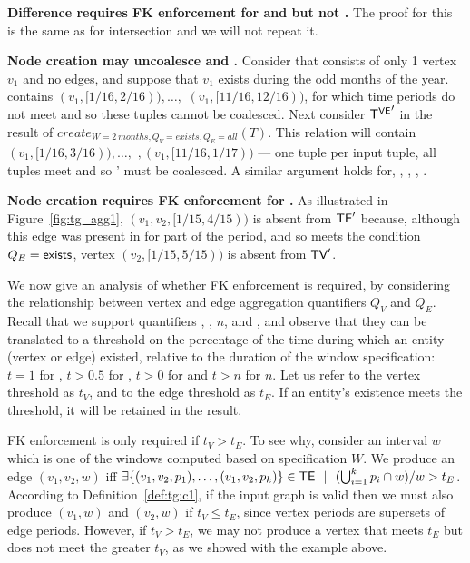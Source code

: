 {\bf Difference requires FK enforcement for \tav and \tae but not \te.}
The proof for this is the same as for intersection and we will not
repeat it.

{\bf Node creation may uncoalesce \tve and \trg.}  Consider
 that consists of only 1 vertex $v_1$ and no edges, and
suppose that $v_1$ exists during the odd months of the year.  \tv
contains $(v_1, [1/16, 2/16)), \ldots,$ $(v_1, [11/16,12/16))$, for
    which time periods do not meet and so these tuples cannot be
    coalesced.  Next consider $\mathsf{T^{VE}}'$ in the result of
    $create_{W=2~months, Q_V=exists,Q_E=all}(T)$.  This relation will
    contain $(v_1, [1/16, 3/16)), \ldots,$ $,(v_1, [11/16,1/17))$ ---
        one tuple per input tuple, all tuples meet and so \tv' must be
        coalesced.  A similar argument holds for, \te, \tav, \tae,
        \trg.

{\bf Node creation requires FK enforcement for \tve.}  As
illustrated in Figure~\ref{fig:tg_agg1}, $(v_1,v_2,[1/15,4/15))$ is
  absent from $\textsf{TE}'$ because, although this edge was present in \tv
  for part of the period, and so meets the condition
  $Q_E=\textsf{exists}$, vertex $(v_2,[1/15,5/15))$ is absent from
    $\textsf{TV}'$.

We now give an analysis of whether FK enforcement is required, by
considering the relationship between vertex and edge aggregation
quantifiers $Q_V$ and $Q_E$.  Recall that we support quantifiers
, ,  $n$, and ,
and observe that they can be translated to a threshold on the
percentage of the time during which an entity (vertex or edge)
existed, relative to the duration of the window specification: $t = 1$
for , $t > 0.5$ for , $t > 0$ for
 and $t > n$ for  $n$.  Let us refer to
the vertex threshold as $t_V$, and to the edge threshold as $t_E$.  If
an entity's existence meets the threshold, it will be retained in the
result.

FK enforcement is only required if $t_V > t_E$.  To see why, consider
an interval $w$ which is one of the windows computed based on
specification $W$.  We produce an edge $(v_1, v_2, w)$ iff $\exists
\{(v_1, v_2, p_1),\ldots,(v_1, v_2, p_k)\} \in
\textsf{TE}~~|~~(\bigcup_{i=1}^k p_i \cap w) / w > t_E$.  According to
Definition~\ref{def:tg:c1}, if the input graph is valid then we must
also produce $(v_1, w)$ and $(v_2, w)$ if $t_V \leq t_E$, since vertex
periods are supersets of edge periods.  However, if $t_V > t_E$, we
may not produce a vertex that meets $t_E$ but does not meet the
greater $t_V$, as we showed with the example above.

